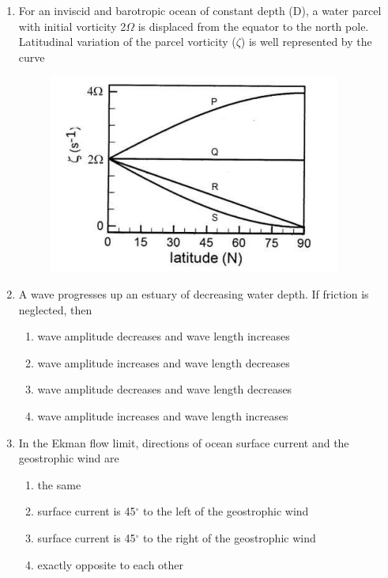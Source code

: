 \documentclass[a4paper,10pt]{article}
\begin{document}
\begin{enumerate}
    \item For an inviscid and barotropic ocean of constant depth (D), a water parcel with initial vorticity 2$\Omega$ is displaced from the equator to the north pole. Latitudinal variation of the parcel vorticity ($\zeta$) is well represented by the curve
    \begin{figure}[H] \centering \includegraphics[width=0.6\columnwidth]{q10_atmos_2018.png} \caption*{} \label{fig:q10_atmos_2018} \end{figure}
    \hfill{}
    \begin{enumerate}[label=\Alph*)]
    \end{enumerate}

    \item A wave progresses up an estuary of decreasing water depth. If friction is neglected, then
    \hfill{}
    \begin{enumerate}[label=\Alph*)]
        \item wave amplitude decreases and wave length increases
        \item wave amplitude increases and wave length decreases
        \item wave amplitude decreases and wave length decreases
        \item wave amplitude increases and wave length increases
    \end{enumerate}

    \item In the Ekman flow limit, directions of ocean surface current and the geostrophic wind are
    \hfill{}
    \begin{enumerate}[label=\Alph*)]
        \item the same
        \item surface current is 45$^{\circ}$ to the left of the geostrophic wind
        \item surface current is 45$^{\circ}$ to the right of the geostrophic wind
        \item exactly opposite to each other
    \end{enumerate}


\end{enumerate}
\end{document}
